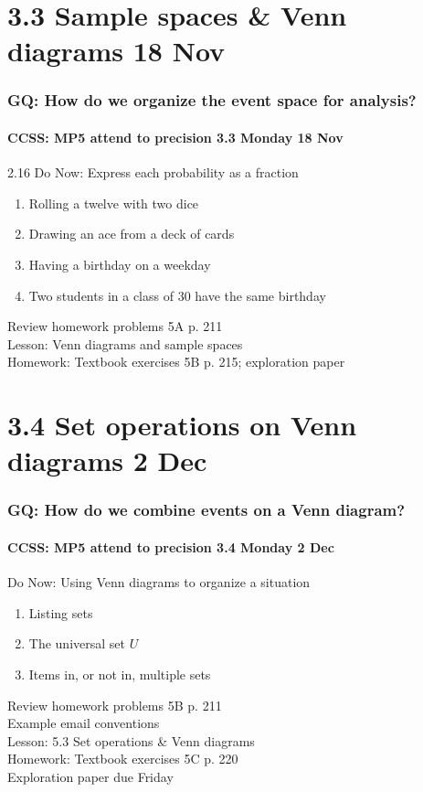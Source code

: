 \documentclass{beamer}
\begin{document}
\section{3.3 Sample spaces \& Venn diagrams 18 Nov}
\frame
{
  \frametitle{GQ: How do we organize the event space for analysis?}
  \framesubtitle{CCSS: MP5 attend to precision \hfill \alert{3.3 Monday 18 Nov}}

  \begin{block}{2.16 Do Now: Express each probability as a fraction}
  \begin{enumerate}
    \item Rolling a twelve with two dice
    \item Drawing an ace from a deck of cards
    \item Having a birthday on a weekday
    \item Two students in a class of 30 have the same birthday
  \end{enumerate}
  \end{block}
  Review homework problems 5A p. 211 \\
  Lesson: Venn diagrams and sample spaces \\ \smallskip
  Homework: Textbook exercises 5B p. 215; exploration paper
}

\section{3.4 Set operations on Venn diagrams 2 Dec}
\frame
{
  \frametitle{GQ: How do we combine events on a Venn diagram?}
  \framesubtitle{CCSS: MP5 attend to precision \hfill \alert{3.4 Monday 2 Dec}}

  \begin{block}{Do Now: Using Venn diagrams to organize a situation}
  \begin{enumerate}
    \item Listing sets
    \item The universal set $U$
    \item Items in, or not in, multiple sets
  \end{enumerate}
  \end{block}
  Review homework problems 5B p. 211 \\
  Example email conventions \\
  Lesson: 5.3 Set operations \& Venn diagrams \\ \smallskip
  Homework: Textbook exercises 5C p. 220 \\
  Exploration paper \alert{due Friday}
}
\end{document}
